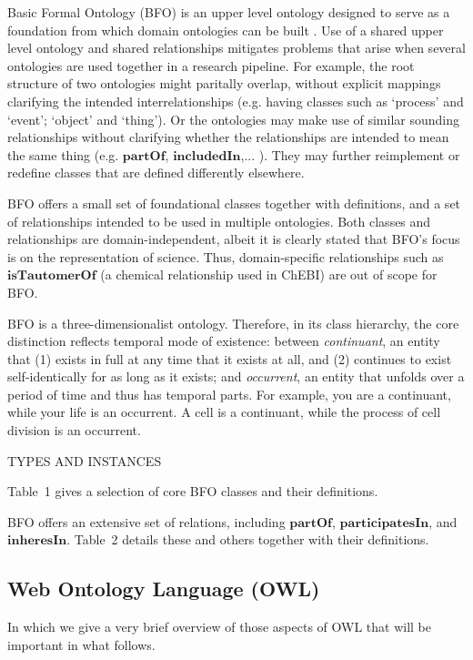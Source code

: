 \documentclass[10pt]{bmc_article}
\newcommand{\mirel}[1]{\ensuremath{\mathrm{\mathbf{#1}}}}
\newenvironment{bmcformat}{\baselineskip20pt\sloppy\setboolean{publ}{false}}{\baselineskip20pt\sloppy}
\begin{document}
\begin{bmcformat}
Basic Formal Ontology (BFO) is an upper level ontology designed to serve as a foundation from which domain ontologies can be built \cite{BFO2:Graz}. 
Use of a shared upper level ontology and shared relationships mitigates problems that arise when several ontologies are used together in a research pipeline. For example, the root structure of two ontologies might paritally overlap, without explicit mappings clarifying the intended interrelationships (e.g. having classes such as `process' and `event'; `object' and `thing'). Or the ontologies may make use of similar sounding relationships without clarifying whether the relationships are intended to mean the same thing (e.g. $\mirel{partOf}$, $\mirel{includedIn}$,... ). They may further reimplement or redefine classes that are defined differently elsewhere.


BFO offers a small set of foundational classes together with definitions, and a set of relationships intended to be used in multiple ontologies. Both classes and relationships are domain-independent, albeit it is clearly stated that BFO's focus is on the representation of science. 
Thus, domain-specific relationships such as $\mirel{isTautomerOf}$ (a chemical relationship used in ChEBI) are out of scope for BFO. 

BFO is a three-dimensionalist ontology. Therefore, in its class hierarchy, the core distinction reflects temporal mode of existence: between \textit{continuant}, an entity that (1) exists in full at any time that it exists at all, and (2) continues to exist self-identically for as long as it exists; and \textit{occurrent}, an entity that unfolds over a period of time and thus has temporal parts.  For example, you are a continuant, while your life is an occurrent.  A cell is a continuant, while the process of cell division is an occurrent.  

TYPES AND INSTANCES

Table~1 gives a selection of core BFO classes and their definitions.

BFO offers an extensive set of relations, including $\mirel{partOf}$, $\mirel{participatesIn}$, and $\mirel{inheresIn}$. 
Table~2 details these and others together with their definitions.

\subsection*{Web Ontology Language (OWL)}

In which we give a very brief overview of those aspects of OWL that will be important in what follows.


\end{bmcformat}
\end{document}

